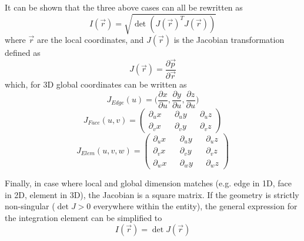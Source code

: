 \noindent
It can be shown that the three above cases can all be rewritten as
\[ I(\vec{r}) = \sqrt{\det(J(\vec{r})^T J(\vec{r}))} \]
where $\vec{r}$ are the local coordinates, and $J(\vec{r})$ is the Jacobian transformation defined as
\[J(\vec{r}) = \frac{\partial \vec{p}}{\partial \vec{r}}\]
which, for 3D global coordinates can be written as
\[J_{Edge}(u) = \bigl(\frac{\partial x}{\partial u}, \frac{\partial y}{\partial u}, \frac{\partial z}{\partial u} \bigr)  \]
\[J_{Face}(u,v) = 
\begin{pmatrix}
   \partial_u x &&    \partial_u y  &&    \partial_u z \\
   \partial_v x &&    \partial_v y  &&    \partial_v z
\end{pmatrix}
\]
\[J_{Elem}(u,v,w) = 
\begin{pmatrix}
   \partial_u x &&    \partial_u y  &&    \partial_u z \\
   \partial_v x &&    \partial_v y  &&    \partial_v z \\
   \partial_w x &&    \partial_w y  &&    \partial_w z
\end{pmatrix}
\]

\noindent
Finally, in case where local and global dimension matches (e.g. edge in 1D, face in 2D, element in 3D), the Jacobian is a square matrix. If the geometry is strictly non-singular ($\det{J} > 0$ everywhere within the entity), the general expression for the integration element can be simplified to
\[ I(\vec{r}) = \det{J(\vec{r})} \]